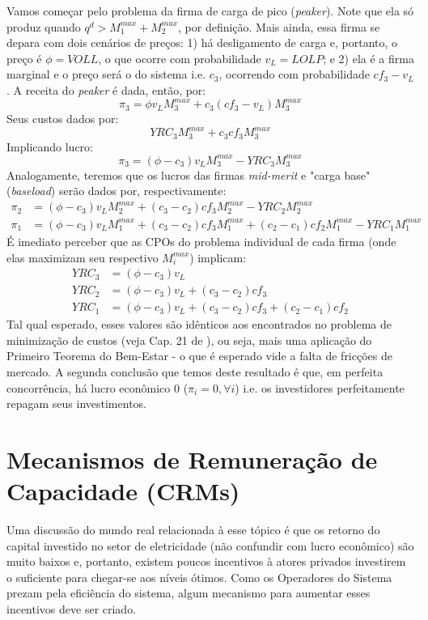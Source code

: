 Vamos começar pelo problema da firma de carga de pico (\textit{peaker}). Note que ela só produz quando $q^d>M_1^{max}+M_2^{max}$, por definição. Mais ainda, essa firma se depara com dois cenários de preços: 1) há desligamento de carga e, portanto, o preço é $\phi=VOLL$, o que ocorre com probabilidade $v_L=LOLP$; e 2) ela é a firma marginal e o preço será o do sistema i.e. $c_3$, ocorrendo com probabilidade $cf_3-v_L$. A receita do 
\textit{peaker} é dada, então, por:
\[\pi_3=\phi v_LM_3^{max}+c_3(cf_3-v_L)M_3^{max}\]
Seus custos dados por:
\[YRC_3M_3^{max}+c_3cf_3M_3^{max}\]
Implicando lucro:
\[\pi_3=(\phi-c_3) v_LM_3^{max}-YRC_3M_3^{max}\]
Analogamente, teremos que os lucros das firmas \textit{mid-merit} e "carga base" (\textit{baseload}) serão dados por, respectivamente:
\begin{align*}
    \pi_2&=(\phi-c_3)v_LM_2^{max}+(c_3-c_2)cf_3M_2^{max}-YRC_2M_2^{max}\\
    \pi_1&=(\phi-c_3)v_LM_1^{max}+(c_3-c_2)cf_3M_1^{max}+(c_2-c_1)cf_2M_1^{max}-YRC_1M_1^{max}
\end{align*}
É imediato perceber que as CPOs do problema individual de cada firma (onde elas maximizam seu respectivo $M_i^{max}$) implicam:
\begin{align*}
    YRC_3&=(\phi-c_3)v_L\\
    YRC_2&=(\phi-c_3)v_L+(c_3-c_2)cf_3\\
    YRC_1&=(\phi-c_3)v_L+(c_3-c_2)cf_3+(c_2-c_1)cf_2
\end{align*}
Tal qual esperado, esses valores são idênticos aos encontrados no problema de minimização de custos (veja Cap. 21 de  \textcite{cretì_fontini_2019}), ou seja, mais uma aplicação do Primeiro Teorema do Bem-Estar - o que é esperado vide a falta de fricções de mercado. A segunda conclusão que temos deste resultado é que, em perfeita concorrência, há lucro econômico 0 ($\pi_i=0,\forall i$) i.e. os investidores perfeitamente repagam seus investimentos.

\section{Mecanismos de Remuneração de Capacidade (CRMs)}
Uma discussão do mundo real relacionada à esse tópico é que os retorno do capital investido no setor de eletricidade (não confundir com lucro econômico) são muito baixos e, portanto, existem poucos incentivos à atores privados investirem o suficiente para chegar-se aos níveis ótimos. Como os Operadores do Sistema prezam pela eficiência do sistema, algum mecanismo para aumentar esses incentivos deve ser criado.

